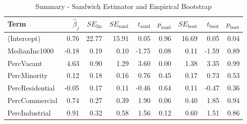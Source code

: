 \begin{table}[ht]
\centering
\begin{tabular}{lrrrrrrrr}
  \hline
Term & $\widehat{\beta}_{j}$ & $SE_{\text{lin}}$ & $SE_{\text{sand}}$ & $t_{\text{sand}}$ & $p_{\text{sand}}$ & $SE_{\text{boot}}$ & $t_{\text{boot}}$ & $p_{\text{boot}}$ \\ 
  \hline
(Intercept) & 0.76 & 22.77 & 15.91 & 0.05 & 0.96 & 16.69 & 0.05 & 0.04 \\ 
  MedianInc1000 & -0.18 & 0.19 & 0.10 & -1.75 & 0.08 & 0.11 & -1.59 & 0.89 \\ 
  PercVacant & 4.63 & 0.90 & 1.29 & 3.60 & 0.00 & 1.38 & 3.35 & 0.99 \\ 
  PercMinority & 0.12 & 0.18 & 0.16 & 0.76 & 0.45 & 0.17 & 0.73 & 0.53 \\ 
  PercResidential & -0.05 & 0.17 & 0.11 & -0.46 & 0.64 & 0.11 & -0.47 & 0.36 \\ 
  PercCommercial & 0.74 & 0.27 & 0.39 & 1.90 & 0.06 & 0.40 & 1.85 & 0.94 \\ 
  PercIndustrial & 0.91 & 0.32 & 0.58 & 1.56 & 0.12 & 0.60 & 1.51 & 0.86 \\ 
   \hline
\end{tabular}
\caption{Summary - Sandwich Estimator and Empirical Bootstrap} 
\end{table}
